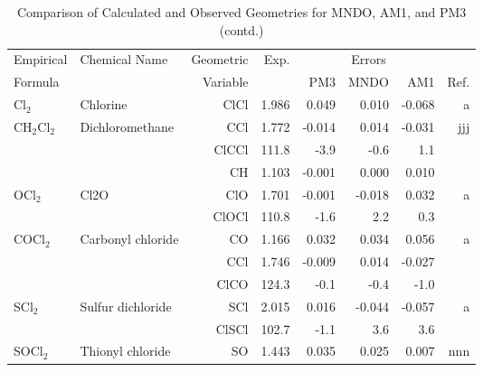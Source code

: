 \clearpage

\begin{table}
\caption{\label{geotabk}Comparison of Calculated and Observed Geometries for 
MNDO, AM1, and PM3 (contd.)}
\begin{center}
\compresstable
\begin{tabular}{llrrrrrr}
 Empirical  & Chemical Name &  Geometric &  Exp. & \multicolumn{3}{c}{Errors} & \\
  Formula   &               &  Variable &        & PM3  & MNDO  &  AM1 & Ref.\\
\hline
 Cl$_2$         & Chlorine                           &ClCl          &     1.986   &     0.049 &     0.010 &    -0.068 &     a \\
 CH$_2$Cl$_2$      & Dichloromethane                    &CCl           &     1.772   &    -0.014 &     0.014 &    -0.031 &   jjj \\
             &                                    &ClCCl       &     111.8   &      -3.9 &      -0.6 &       1.1   &       \\
             &                                    &CH            &     1.103   &    -0.001 &     0.000 &     0.010 &       \\
 OCl$_2$        & Cl2O                               &ClO           &     1.701   &    -0.001 &    -0.018 &     0.032 &     a \\
             &                                    &ClOCl       &     110.8   &      -1.6 &       2.2 &       0.3   &       \\
 COCl$_2$       & Carbonyl chloride                  &CO            &     1.166   &     0.032 &     0.034 &     0.056 &     a \\
             &                                    &CCl           &     1.746   &    -0.009 &     0.014 &    -0.027 &       \\
             &                                    &ClCO        &     124.3   &      -0.1 &      -0.4 &      -1.0   &       \\
 SCl$_2$        & Sulfur dichloride                  &SCl           &     2.015   &     0.016 &    -0.044 &    -0.057 &     a \\
             &                                    &ClSCl       &     102.7   &      -1.1 &       3.6 &       3.6   &       \\
 SOCl$_2$       & Thionyl chloride                   &SO            &     1.443   &     0.035 &     0.025 &     0.007 &   nnn \\

\end{tabular}
\end{center}
\end{table}
